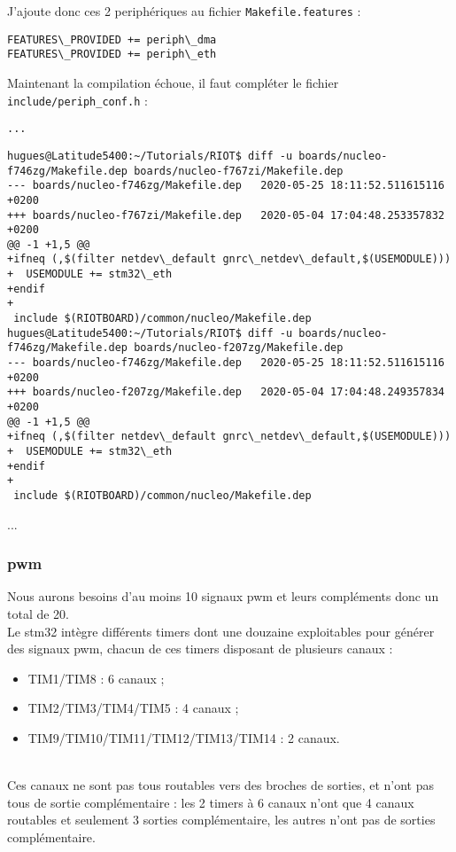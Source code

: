 J'ajoute donc ces 2 periphériques au fichier
\texttt{Makefile.features} :
\begin{verbatim}
FEATURES\_PROVIDED += periph\_dma
FEATURES\_PROVIDED += periph\_eth
\end{verbatim}

Maintenant la compilation échoue, il faut compléter le fichier
\texttt{include/periph\_conf.h} :
\begin{verbatim}
...
\end{verbatim}

{\scriptsize
\begin{verbatim}
hugues@Latitude5400:~/Tutorials/RIOT$ diff -u boards/nucleo-f746zg/Makefile.dep boards/nucleo-f767zi/Makefile.dep
--- boards/nucleo-f746zg/Makefile.dep	2020-05-25 18:11:52.511615116 +0200
+++ boards/nucleo-f767zi/Makefile.dep	2020-05-04 17:04:48.253357832 +0200
@@ -1 +1,5 @@
+ifneq (,$(filter netdev\_default gnrc\_netdev\_default,$(USEMODULE)))
+  USEMODULE += stm32\_eth
+endif
+
 include $(RIOTBOARD)/common/nucleo/Makefile.dep
hugues@Latitude5400:~/Tutorials/RIOT$ diff -u boards/nucleo-f746zg/Makefile.dep boards/nucleo-f207zg/Makefile.dep 
--- boards/nucleo-f746zg/Makefile.dep	2020-05-25 18:11:52.511615116 +0200
+++ boards/nucleo-f207zg/Makefile.dep	2020-05-04 17:04:48.249357834 +0200
@@ -1 +1,5 @@
+ifneq (,$(filter netdev\_default gnrc\_netdev\_default,$(USEMODULE)))
+  USEMODULE += stm32\_eth
+endif
+
 include $(RIOTBOARD)/common/nucleo/Makefile.dep
\end{verbatim}
}
...

\subsubsection{pwm}
Nous aurons besoins d'au moins 10 signaux pwm et leurs compléments donc
un total de 20.\\

Le stm32 intègre différents timers dont une douzaine exploitables pour
générer des signaux pwm, chacun de ces timers disposant de plusieurs
canaux :
\begin{itemize}
    \item TIM1/TIM8 : 6 canaux ;
    \item TIM2/TIM3/TIM4/TIM5 : 4 canaux ;
    \item TIM9/TIM10/TIM11/TIM12/TIM13/TIM14 : 2 canaux.
\end{itemize}
~\\

Ces canaux ne sont pas tous routables vers des broches de sorties, et
n'ont pas tous de sortie complémentaire : les 2 timers à 6
canaux n'ont que 4 canaux routables et seulement 3 sorties
complémentaire, les autres n'ont pas de sorties complémentaire.\\

